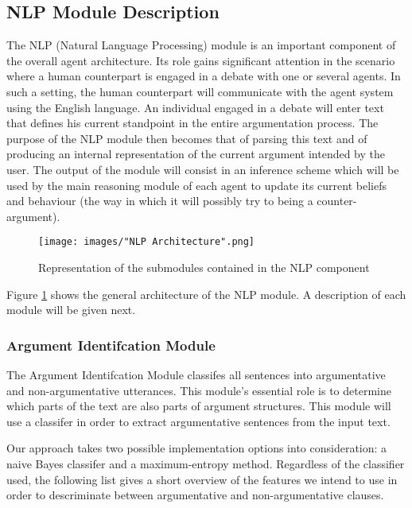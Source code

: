 \subsection{NLP Module Description}

The NLP (Natural Language Processing) module is an important component of the overall agent architecture. Its role gains significant attention in the scenario where a human counterpart is engaged in a debate with one or several agents.
In such a setting, the human counterpart will communicate with the agent system using the English language. An individual engaged in a debate will enter text that defines his current standpoint in the entire argumentation process.
The purpose of the NLP module then becomes that of parsing this text and of producing an internal representation of the current argument intended by the user. The output of the module will consist in an inference scheme which will be used by
the main reasoning module of each agent to update its current beliefs and behaviour (the way in which it will possibly try to being a counter-argument).

\begin{figure}
\texttt{[image: images/"NLP Architecture".png]}
\caption{Representation of the submodules contained in the NLP component}
\label{fig:NLPArchitecture}
\end{figure}

Figure \ref{fig:NLPArchitecture} shows the general architecture of the NLP module. A description of each module will be given next.

\subsubsection{Argument Identifcation Module}
\par
The Argument Identifcation Module classifes all sentences into argumentative and non-argumentative utterances. This module's essential role is to determine which parts of the text are also parts of argument structures.
This module will use a classifer in order to extract argumentative sentences from the input text. 

\par
Our approach takes two possible implementation options into consideration: a naive Bayes classifer and a maximum-entropy method. Regardless of the classifier used, the following list gives a short overview of the features
we intend to use in order to descriminate between argumentative and non-argumentative clauses.

